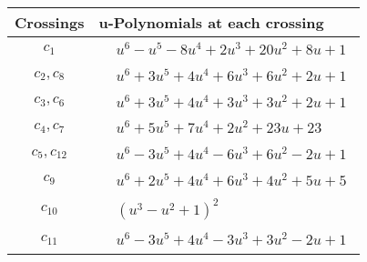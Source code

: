 \documentclass[1p]{elsarticle_modified}
\theoremstyle{definition}
\begin{document}
\begin{tabular}{m{50pt}|m{274pt}}
Crossings & \hspace{64pt}u-Polynomials at each crossing \\
\hline $$\begin{aligned}c_{1}\end{aligned}$$&$\begin{aligned}
&u^6- u^5-8 u^4+2 u^3+20 u^2+8 u+1
\end{aligned}$\\
\hline $$\begin{aligned}c_{2},c_{8}\end{aligned}$$&$\begin{aligned}
&u^6+3 u^5+4 u^4+6 u^3+6 u^2+2 u+1
\end{aligned}$\\
\hline $$\begin{aligned}c_{3},c_{6}\end{aligned}$$&$\begin{aligned}
&u^6+3 u^5+4 u^4+3 u^3+3 u^2+2 u+1
\end{aligned}$\\
\hline $$\begin{aligned}c_{4},c_{7}\end{aligned}$$&$\begin{aligned}
&u^6+5 u^5+7 u^4+2 u^2+23 u+23
\end{aligned}$\\
\hline $$\begin{aligned}c_{5},c_{12}\end{aligned}$$&$\begin{aligned}
&u^6-3 u^5+4 u^4-6 u^3+6 u^2-2 u+1
\end{aligned}$\\
\hline $$\begin{aligned}c_{9}\end{aligned}$$&$\begin{aligned}
&u^6+2 u^5+4 u^4+6 u^3+4 u^2+5 u+5
\end{aligned}$\\
\hline $$\begin{aligned}c_{10}\end{aligned}$$&$\begin{aligned}
&(u^3- u^2+1)^2
\end{aligned}$\\
\hline $$\begin{aligned}c_{11}\end{aligned}$$&$\begin{aligned}
&u^6-3 u^5+4 u^4-3 u^3+3 u^2-2 u+1
\end{aligned}$\\
\hline
\end{tabular}\\~\\
\end{document}
